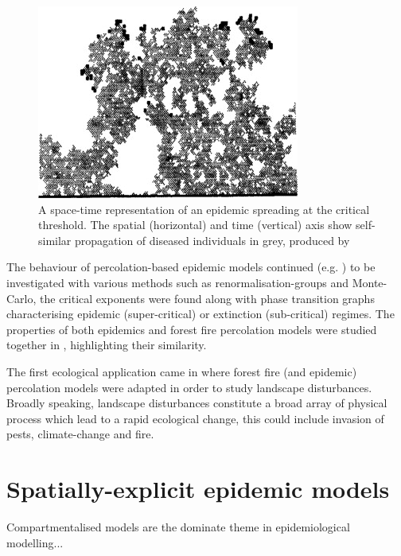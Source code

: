 \begin{figure}
    \centering
    \includegraphics{chapter2/figures/perc1.jpg}
    \caption{A space-time representation of an epidemic spreading at the critical threshold. The spatial (horizontal) and time (vertical) axis show self-similar propagation of diseased individuals in grey, produced by \cite{GRASSBERGER1986273}}
    \label{fig:1d_perc_basis}
\end{figure}

The behaviour of percolation-based epidemic models continued (e.g. \cite{pub.1060474189, pub.1059069981}) to be investigated with various methods such as renormalisation-groups and Monte-Carlo, the critical exponents were found along with phase transition graphs characterising epidemic (super-critical) or extinction (sub-critical) regimes. The properties of both epidemics and forest fire percolation models were studied together in \cite{pub.1052857560}, highlighting their similarity.

The first ecological application came in \cite{pub.1031591030} where forest fire (and epidemic) percolation models were adapted in order to study landscape disturbances. Broadly speaking, landscape disturbances constitute a broad array of physical process which lead to a rapid ecological change, this could include invasion of pests, climate-change and fire.


\section{Spatially-explicit epidemic models}
\label{ch2:lit-rev-compartmentalised-models}
Compartmentalised models are the dominate theme in epidemiological modelling...

